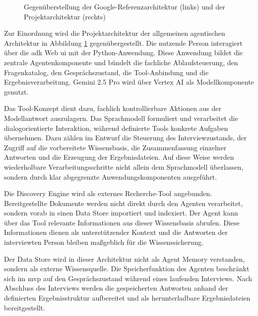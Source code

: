 \documentclass[
  10pt,
  ngerman,
  a4paper,
  toc=graduated,
  numbers=noenddot,
  headings=standardclasses,
  nonumberlist
]{scrartcl}
\begin{document}
\begin{figure}[H]
\centering

\begin{minipage}[t]{0.48\textwidth}
    \centering
    
\end{minipage}
\hfill
\begin{minipage}[t]{0.48\textwidth}
    \centering
    
\end{minipage}

\caption{Gegenüberstellung der Google-Referenzarchitektur \cite{google_ai_architecture} (links) und der Projektarchitektur (rechts)}
\label{fig:architekturvergleich_agent}
\end{figure}
Zur Einordnung wird die Projektarchitektur der allgemeinen agentischen Architektur in Abbildung \ref{fig:architekturvergleich_agent} gegenübergestellt.
Die nutzende Person interagiert über die \gls{adk} Web \gls{ui} mit der Python-Anwendung. Diese Anwendung bildet die zentrale Agentenkomponente und bündelt die fachliche Ablaufsteuerung, den Fragenkatalog, den Gesprächszustand, die Tool-Anbindung und die Ergebnisverarbeitung. Gemini 2.5 Pro wird über Vertex AI als Modellkomponente genutzt.

Das Tool-Konzept dient dazu, fachlich kontrollierbare Aktionen aus der Modellantwort auszulagern. Das Sprachmodell formuliert und verarbeitet die dialogorientierte Interaktion, während definierte Tools konkrete Aufgaben übernehmen. Dazu zählen im Entwurf die Steuerung des Interviewzustands, der Zugriff auf die vorbereitete Wissensbasis, die Zusammenfassung einzelner Antworten und die Erzeugung der Ergebnisdateien. Auf diese Weise werden wiederholbare Verarbeitungsschritte nicht allein dem Sprachmodell überlassen, sondern durch klar abgegrenzte Anwendungskomponenten ausgeführt.

Die Discovery Engine wird als externes Recherche-Tool angebunden. Bereitgestellte Dokumente werden nicht direkt durch den Agenten verarbeitet, sondern vorab in einen Data Store importiert und indexiert. Der Agent kann über das Tool relevante Informationen aus dieser Wissensbasis abrufen. Diese Informationen dienen als unterstützender Kontext und die Antworten der interviewten Person bleiben maßgeblich für die Wissenssicherung.

Der Data Store wird in dieser Architektur nicht als Agent Memory verstanden, sondern als externe Wissensquelle. Die Speicherfunktion des Agenten beschränkt sich im \gls{mvp} auf den Gesprächszustand während eines laufenden Interviews. Nach Abschluss des Interviews werden die gespeicherten Antworten anhand der definierten Ergebnisstruktur aufbereitet und als herunterladbare Ergebnisdateien bereitgestellt.
\end{document}
